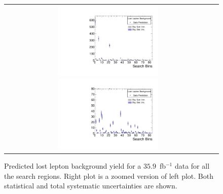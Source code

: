 \begin{figure}[htbp]
  \begin{center}
  \begin{tabular}{cc}
  \includegraphics[angle=0,width=0.5\textwidth]{sections/mc4/Backgrounds/TF/figures/pred_full_lostle_comb.pdf}
  \includegraphics[angle=0,width=0.5\textwidth]{sections/mc4/Backgrounds/TF/figures/pred_zoomin_lostle_comb.pdf}
  \end{tabular}
  \caption{Predicted lost lepton background yield for a $35.9$~fb$^{-1}$ data for all the search regions. Right plot is a zoomed version of left plot.
Both statistical and total systematic uncertainties are shown. }
    \label{fig:LLpredictionSB}
  \end{center}
\end{figure}
